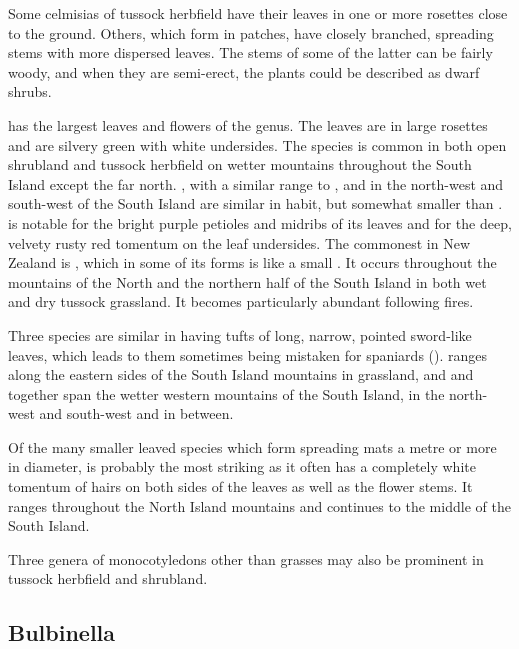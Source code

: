Some celmisias of tussock herbfield have their leaves in one or more rosettes close to the ground.
Others, which form in patches, have closely branched, spreading stems with more dispersed leaves.
The stems of some of the latter can be fairly woody, and when they are semi-erect, the plants could be described as dwarf shrubs.

 has the largest leaves and flowers of the genus.
The leaves are in large rosettes and are silvery green with white undersides.
The species is common in both open shrubland and tussock herbfield on wetter mountains throughout the South Island except the far north. , with a similar range to , and   in the north-west and south-west of the South Island are similar in habit, but somewhat smaller than .  is notable for the bright purple petioles and midribs of its leaves and  for the deep, velvety rusty red tomentum on the leaf undersides.
The commonest  in New Zealand is , which in some of its forms is like a small .
It occurs throughout the mountains of the North and the northern half of the South Island in both wet and dry tussock grassland.
It becomes particularly abundant following fires.

Three species are similar in having tufts of long, narrow, pointed sword-like leaves, which leads to them sometimes being mistaken for spaniards ().  ranges along the eastern sides of the South Island mountains in  grassland, and   and   together span the wetter western mountains of the South Island,   in the north-west and south-west and   in between.

Of the many smaller leaved species which form spreading mats a metre or more in diameter,  is probably the most striking as it often has a completely white tomentum of hairs on both sides of the leaves as well as the flower stems.
It ranges throughout the North Island mountains and continues to the middle of the South Island.

Three genera of monocotyledons other than grasses may also be prominent in tussock herbfield and shrubland.

\subsection{Bulbinella}

